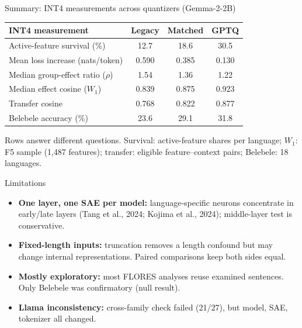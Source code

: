 \documentclass[aspectratio=169,11pt]{beamer}
\newcommand{\aside}[1]{{\small\color{muted}#1}}
\begin{document}
\begin{frame}{Summary: INT4 measurements across quantizers (Gemma-2-2B)}
\centering
\small
\begin{tabular}{lccc}
\toprule
\textbf{INT4 measurement} & \textbf{Legacy} & \textbf{Matched} & \textbf{GPTQ}\\
\midrule
Active-feature survival (\%) & 12.7 & 18.6 & 30.5\\
Mean loss increase (nats/token) & 0.590 & 0.385 & 0.130\\
Median group-effect ratio ($\rho$) & 1.54 & 1.36 & 1.22\\
Median effect cosine ($W_1$) & 0.839 & 0.875 & 0.923\\
Transfer cosine & 0.768 & 0.822 & 0.877\\
Belebele accuracy (\%) & 23.6 & 29.1 & 31.8\\
\bottomrule
\end{tabular}
\vspace{6pt}
\aside{Rows answer different questions. Survival: active-feature shares per language; $W_1$: F5 sample (1,487 features); transfer: eligible feature--context pairs; Belebele: 18 languages.}
\end{frame}

\begin{frame}{Limitations}
\small
\begin{itemize}
\item \textbf{One layer, one SAE per model:} language-specific neurons concentrate in early/late layers (Tang et al., 2024; Kojima et al., 2024); middle-layer test is conservative.
\item \textbf{Fixed-length inputs:} truncation removes a length confound but may change internal representations. Paired comparisons keep both sides equal.
\item \textbf{Mostly exploratory:} most FLORES analyses reuse examined sentences. Only Belebele was confirmatory (null result).
\item \textbf{Llama inconsistency:} cross-family check failed (21/27), but model, SAE, tokenizer all changed.
\end{itemize}
\end{frame}
\end{document}
